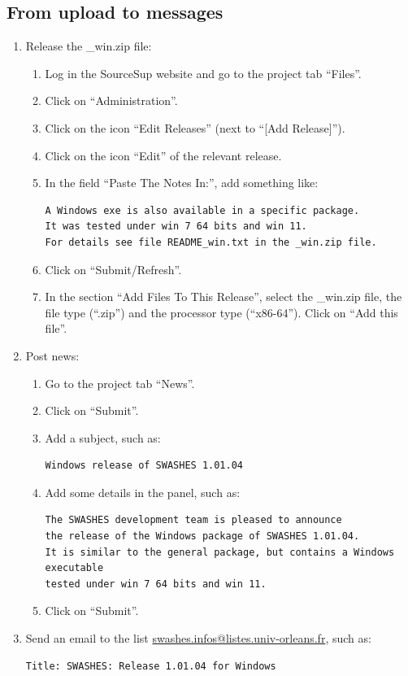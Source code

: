 \documentclass[a4paper, 11pt]{article}
\begin{document}
\subsection{From upload to messages}
\begin{enumerate}
\item Release the \_win.zip file:
\begin{enumerate}
\item Log in the SourceSup website and go to the project tab ``Files''.
\item Click on ``Administration''.
\item Click on the icon ``Edit Releases'' (next to ``[Add Release]'').
\item Click on the icon ``Edit'' of the relevant release.
\item In the field ``Paste The Notes In:'', add something like:
\begin{verbatim}
A Windows exe is also available in a specific package.
It was tested under win 7 64 bits and win 11.
For details see file README_win.txt in the _win.zip file.
\end{verbatim}
\item Click on ``Submit/Refresh''.
\item In the section ``Add Files To This Release'', select the \_win.zip file,
the file type (``.zip'') and the processor type  (``x86-64''). Click on ``Add this file''.
\end{enumerate}
\item Post news:
\begin{enumerate}
\item Go to the project tab ``News''.
\item Click on ``Submit''.
\item Add a subject, such as:
\begin{verbatim}
Windows release of SWASHES 1.01.04 
\end{verbatim}
\item Add some details in the panel, such as:
\begin{verbatim}
The SWASHES development team is pleased to announce
the release of the Windows package of SWASHES 1.01.04.
It is similar to the general package, but contains a Windows executable
tested under win 7 64 bits and win 11.
\end{verbatim}
\item Click on ``Submit''.
\end{enumerate}
\item Send an email to the list
\href{mailto:swashes.infos@listes.univ-orleans.fr}{swashes.infos@listes.univ-orleans.fr}, such as:
\begin{verbatim}
Title: SWASHES: Release 1.01.04 for Windows


\end{verbatim}
\end{enumerate}
\end{document}
